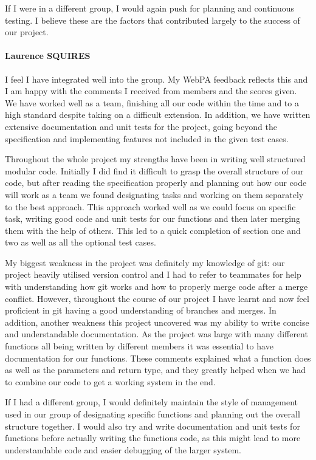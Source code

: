 \documentclass[10pt]{article}
\begin{document}
If I were in a different group, I would again push for planning and continuous testing. I believe these are the factors that contributed largely to the success of our project.

\paragraph{Laurence SQUIRES}
I feel I have integrated well into the group. My WebPA feedback reflects this and I am happy with the comments I received from members and the scores given. We have worked well as a team, finishing all our code within the time and to a high standard despite taking on a difficult extension. In addition, we have written extensive documentation and unit tests for the project, going beyond the specification and implementing features not included in the given test cases. 

Throughout the whole project my strengths have been in writing well structured modular code. Initially I did find it difficult to grasp the overall structure of our code, but after reading the specification properly and planning out how our code will work as a team we found designating tasks and working on them separately to the best approach. This approach worked well as we could focus on specific task, writing good code and unit tests for our functions and then later merging them with the help of others. This led to a quick completion of section one and two as well as all the optional test cases.

My biggest weakness in the project was definitely my knowledge of git: our project heavily utilised version control and I had to refer to teammates for help with understanding how git works and how to properly merge code after a merge conflict. However, throughout the course of our project I have learnt and now feel proficient in git having a good understanding of branches and merges. In addition, another weakness this project uncovered was my ability to write concise and understandable documentation. As the project was large with many different functions all being written by different members it was essential to have documentation for our functions. These comments explained what a function does as well as the parameters and return type, and they greatly helped when we had to combine our code to get a working system in the end.

If I had a different group, I would definitely maintain the style of management used in our group of designating specific functions and planning out the overall structure together. I would also try and write documentation and unit tests for functions before actually writing the functions code, as this might lead to more understandable code and easier debugging of the larger system.
\end{document}
